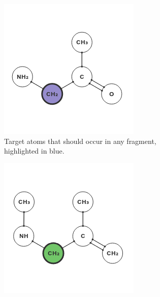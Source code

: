 \begin{figure}
\centering
\begin{subfigure}[t]{0.29\textwidth}
\centering
\includegraphics[width=\textwidth]{img/shell_1.png}
\caption{Target atoms that should occur in any fragment, highlighted in blue.}
\end{subfigure}%
\qquad
\begin{subfigure}[t]{0.29\textwidth}
\centering
\includegraphics[width=\textwidth]{img/shell_2.png}

\end{subfigure}
\end{figure}
